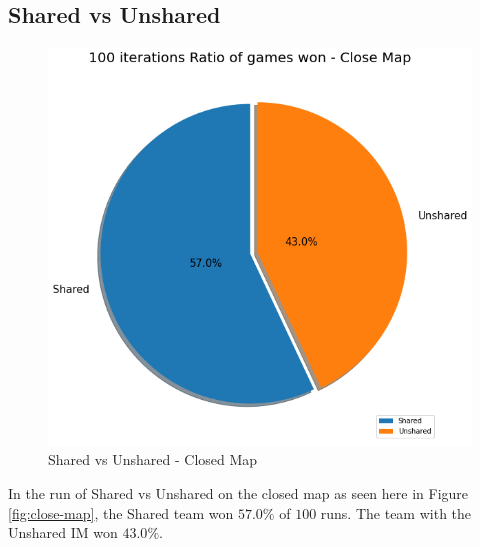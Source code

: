 \documentclass[]{report}
\begin{document}
		\subsection{Shared vs Unshared}
		\begin{figure}[h!]
			\centering
			\includegraphics[width=0.9\linewidth]{"Images/100 Games Shared vs Unshared Close Map"}
			\caption[Shared vs Unshared - Closed Map]{Shared vs Unshared - Closed Map}
			\label{fig:100-games-shared-vs-unshared-close-map}
		\end{figure}
		In the run of Shared vs Unshared on the closed map as seen here in Figure \ref{fig:close-map}, the Shared team won $57.0\%$ of $100$ runs. The team with the Unshared \ac{IM} won $43.0\%$.
		
		\clearpage
\end{document}
